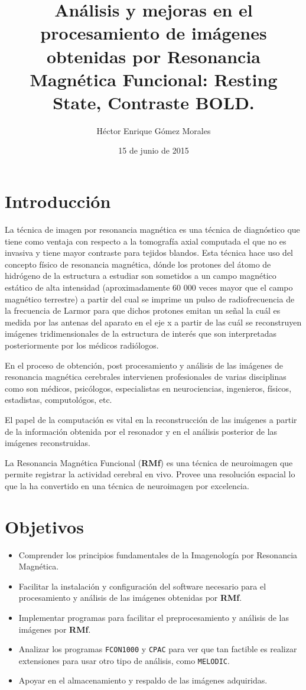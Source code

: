 \documentclass{article}
\author{Héctor Enrique Gómez Morales}
\title{Análisis y mejoras en el procesamiento de imágenes obtenidas por Resonancia Magnética Funcional: Resting State, Contraste BOLD.}
\date{15 de junio de 2015}
\begin{document}
\section{Introducción}

La técnica de imagen por resonancia magnética es una técnica de diagnóstico que tiene como ventaja con respecto a la tomografía axial computada el que no es invasiva y tiene mayor contraste para tejidos blandos. Esta técnica hace uso del concepto físico de resonancia magnética, dónde los protones del átomo de hidrógeno de la estructura a estudiar son sometidos a un campo magnético estático de alta intensidad (aproximadamente 60 000 veces mayor que el campo magnético terrestre) a partir del cual se imprime un pulso de radiofrecuencia de la frecuencia de Larmor para que dichos protones emitan un señal la cuál es medida por las antenas del aparato en el eje x a partir de las cuál se reconstruyen imágenes tridimensionales de la estructura de interés que son interpretadas posteriormente por los médicos radiólogos.

En el proceso de obtención, post procesamiento y análisis de las imágenes de resonancia magnética cerebrales intervienen profesionales de varias disciplinas como son médicos, psicólogos, especialistas en neurociencias, ingenieros, físicos, estadistas, computológos, etc.

El papel de la computación es vital en la reconstrucción de las imágenes a partir de la información obtenida por el resonador y en el análisis posterior de las imágenes reconstruidas.

La Resonancia Magnética Funcional (\textbf{RMf}) es una técnica de neuroimagen que permite registrar la actividad cerebral en vivo. Provee una resolución espacial lo que la ha convertido en una técnica de neuroimagen por excelencia. 

\section{Objetivos}

\begin{itemize}
\item Comprender los principios fundamentales de la Imagenología por Resonancia Magnética.

\item Facilitar la instalación y configuración del software necesario para el procesamiento y análisis de las imágenes obtenidas por \textbf{RMf}.

\item Implementar programas para facilitar el preprocesamiento y análisis de las imágenes por \textbf{RMf}.

\item Analizar los programas \texttt{FCON1000} y \texttt{CPAC} para ver que tan factible es realizar extensiones para usar otro tipo de análisis, como \texttt{MELODIC}.

\item Apoyar en el almacenamiento y respaldo de las imágenes adquiridas.
\end{itemize}
\end{document}
